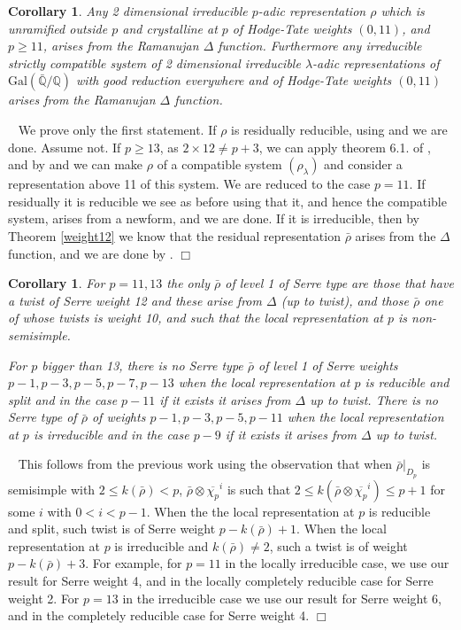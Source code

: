 \documentclass[12pt]{article}
\newcommand{\rhobar}{\overline{\rho}}
\newtheorem{cor}[theorem]{Corollary}
\newenvironment{proof}{\smallskip\noindent{\bf Proof.}\
}{$\Box$\smallskip\goodbreak}
\def\rhobar{ {\bar {\rho} } }
\def\rhob{ {\bar {\rho} } }
\newcommand{\Galois}{\mathrm{Gal}}
\newcommand{\Gal}{\Galois( \bar{ {\mathbb Q}}/{\mathbb Q})}
\begin{document}
\begin{cor}
Any 2 dimensional irreducible $p$-adic
representation $\rho$ which is unramified outside $p$ and crystalline
at  $p$ of Hodge-Tate
weights $(0,11)$, and $p \geq 11$, arises
from the Ramanujan $\Delta$ function. Furthermore any
irreducible strictly compatible system
of 2 dimensional irreducible $\lambda$-adic representations of $\Gal$
with good reduction everywhere and of Hodge-Tate
weights $(0,11)$ arises from the Ramanujan $\Delta$ function.
\end{cor}

\begin{proof} We prove only the first statement. If $\rho$ is residually
reducible, using
\cite{BLZ} and  \cite{SW2} we are done.
Assume not. If $p\geq 13$, as $2\times 12\not=p+3$,
we can apply theorem 6.1. of \cite{[T03]}, and by \cite{D}
and \cite{Wint} we can make $\rho$
of a compatible system $(\rho_{\lambda})$ and consider a representation
above 11 of this system. 
We are reduced to the case $p=11$. 
If residually it is reducible
we see as before using \cite{SW2} that it, and hence the compatible
system, arises from a newform, and we are done. If it is irreducible,
then by  Theorem \ref{weight12} we know that the residual
representation $\rhob$ arises from the $\Delta$ function, and we are
done by \cite{SW3}.
\end{proof}


\begin{cor}\label{ugly}
For $p=11,13$ the only $\rhob$ of level 1 of Serre type are
those that have a twist of Serre weight 12  and these arise from
$\Delta$ (up to twist), and  those $\rhob$
one of whose twists is weight 10,
and such that the local representation at $p$ is non-semisimple.

For $p$ bigger than 13, there is no Serre type $\rhobar$ of level 1 of
Serre weights
$p-1,p-3,p-5,p-7,p-13$ when the local  representation at $p$ is
reducible
and split and in the case $p-11$ if it exists it arises from $\Delta$
up to twist.
There is no Serre type of $\rhobar$ of weights
$p-1,p-3,p-5,p-11$ when the local  representation at $p$ is
irreducible
and in the case $p-9$ if it exists it arises from $\Delta$ up to twist.
\end{cor}

\begin{proof} This follows from the previous work using the
observation that when  $\rhob|_{D_p}$ is semisimple with $2 \leq k(\rhob) <
p$, $\rhob \otimes \overline{\chi_p}^i$  is such that $2 \leq k(\rhob \otimes
\overline{\chi_p}^i) \leq p+1$ for some $i$ with $0 < i <p-1$.
When the the local  representation at $p$ is
reducible and split, such twist is of Serre weight $p-k(\rhob )+1$.
When the local  representation at $p$ is 
irreducible and $k(\rhob )\not=2$, such a twist is of weight $p-k(\rhob )+3$.
For
example, for $p=11$ in the locally irreducible case, we use our result for
Serre
weight 4,
and in the locally completely reducible case for Serre weight 2. For $p=13$
in the irreducible case we use our result for Serre weight 6, and in the
completely reducible case for Serre weight 4.
\end{proof}
\end{document}
